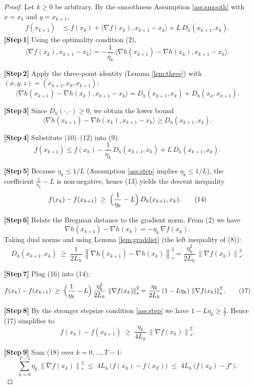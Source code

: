 \documentclass{article}
\newcommand{\dualnorm}[1]{\left\lVert#1\right\rVert_{*}}
\newcommand{\inner}[2]{\langle #1,#2\rangle}
\newcommand{\D}[2]{D_{h}(#1,#2)}
\begin{document}
\begin{proof}
Let $k\ge0$ be arbitrary. By the smoothness Assumption
\ref{ass:smooth} with $x=x_k$ and $y=x_{k+1}$,
\begin{align}
f(x_{k+1})
&\le f(x_k)+\inner{\nabla f(x_k)}{x_{k+1}-x_k}
   +L\,\D{x_{k+1}}{x_k}.
\tag{9}
\end{align}
\textbf{[Step 1]} Using the optimality condition (2),
\[
\inner{\nabla f(x_k)}{x_{k+1}-x_k}
= -\frac{1}{\eta_k}\,
   \inner{\nabla h(x_{k+1})-\nabla h(x_k)}{x_{k+1}-x_k}.
\tag{10}
\]

\textbf{[Step 2]} Apply the three‑point identity (Lemma \ref{lem:three})
with $(x,y,z)=(x_{k+1},x_k,x_{k+1})$:
\[
\inner{\nabla h(x_{k+1})-\nabla h(x_k)}{x_{k+1}-x_k}
= \D{x_{k+1}}{x_k}+ \D{x_k}{x_{k+1}}.
\tag{11}
\]

\textbf{[Step 3]} Since $D_h(\cdot,\cdot)\ge0$, we obtain the lower bound
\[
\inner{\nabla h(x_{k+1})-\nabla h(x_k)}{x_{k+1}-x_k}
\ge \D{x_{k+1}}{x_k}.
\tag{12}
\]

\textbf{[Step 4]} Substitute (10)–(12) into (9):
\[
f(x_{k+1})
\le f(x_k) -\frac{1}{\eta_k}\,\D{x_{k+1}}{x_k}
      +L\,\D{x_{k+1}}{x_k}.
\tag{13}
\]

\textbf{[Step 5]} Because $\eta_k\le 1/L$ (Assumption \ref{ass:step} implies
$\eta_k\le 1/L$), the coefficient $ \frac{1}{\eta_k}-L$ is non‑negative,
hence (13) yields the descent inequality
\[
f(x_{k})-f(x_{k+1})
\;\ge\;
\Bigl(\frac{1}{\eta_k}-L\Bigr)\,\D{x_{k+1}}{x_k}.
\tag{14}
\]

\textbf{[Step 6]} Relate the Bregman distance to the gradient norm.
From (2) we have
\[
\nabla h(x_{k+1})-\nabla h(x_k) = -\eta_k\,\nabla f(x_k).
\tag{15}
\]
Taking dual norms and using Lemma \ref{lem:graddist} (the left inequality of (8)):
\[
\D{x_{k+1}}{x_k}
\;\ge\;
\frac{1}{2L_h}\,
\dualnorm{\nabla h(x_{k+1})-\nabla h(x_k)}^{2}
=
\frac{\eta_k^{2}}{2L_h}\,
\dualnorm{\nabla f(x_k)}^{2}.
\tag{16}
\]

\textbf{[Step 7]} Plug (16) into (14):
\[
f(x_k)-f(x_{k+1})
\;\ge\;
\Bigl(\frac{1}{\eta_k}-L\Bigr)\,
\frac{\eta_k^{2}}{2L_h}\,
\dualnorm{\nabla f(x_k)}^{2}
=
\frac{\eta_k}{2L_h}\,(1-L\eta_k)\,
\dualnorm{\nabla f(x_k)}^{2}.
\tag{17}
\]

\textbf{[Step 8]} By the stronger stepsize condition \eqref{ass:step}
we have $1-L\eta_k\ge \tfrac12$. Hence (17) simplifies to
\[
f(x_k)-f(x_{k+1})
\;\ge\;
\frac{\eta_k}{4L_h}\,
\dualnorm{\nabla f(x_k)}^{2}.
\tag{18}
\]

\textbf{[Step 9]} Sum (18) over $k=0,\dots,T-1$:
\[
\sum_{k=0}^{T-1}\eta_k\,
\dualnorm{\nabla f(x_k)}^{2}
\;\le\;
4L_h\,
\bigl(f(x_0)-f(x_T)\bigr)
\;\le\;
4L_h\,
\bigl(f(x_0)-f^\star\bigr).
\tag{19}
\]


\end{proof}
\end{document}
